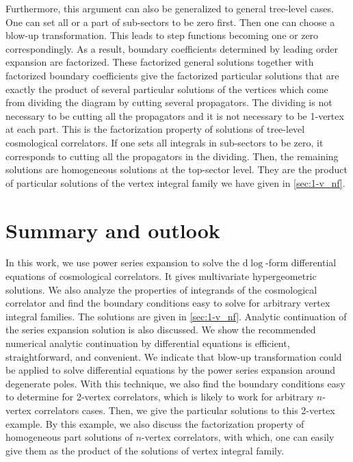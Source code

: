 \documentclass[a4paper,11pt]{article}
\newcommand{\nd}{\mathrm{d}}
\begin{document}
Furthermore, this argument can also be generalized to general tree-level cases. One can set all or a part of sub-sectors to be zero first. Then one can choose a blow-up transformation. This leads to step functions becoming one or zero correspondingly. As a result, boundary coefficients determined by leading order expansion are factorized. These factorized general solutions together with factorized boundary coefficients give the factorized particular solutions that are exactly the product of several particular solutions of the vertices which come from dividing the diagram by cutting several propagators. The dividing is not necessary to be cutting all the propagators and it is not necessary to be  1-vertex at each part.  This is the factorization property of solutions of tree-level cosmological correlators. If one sets all integrals in sub-sectors to be zero, it corresponds to cutting all the propagators in the dividing. Then, the remaining solutions are homogeneous solutions at the top-sector level. They are the product of particular solutions of the vertex integral family we have given in \ref{sec:1-v_nf}.







\section{Summary and outlook}\label{sec:summary}

In this work, we use power series expansion to solve the $\nd \log$-form differential equations of cosmological correlators. It gives multivariate hypergeometric solutions. We also analyze the properties of integrands of the cosmological correlator and find the boundary conditions easy to solve for arbitrary vertex integral families. The solutions are given in \ref{sec:1-v_nf}. Analytic continuation of the series expansion solution is also discussed. We show the recommended numerical analytic continuation by differential equations is efficient, straightforward, and convenient.  We indicate that blow-up transformation could be applied to solve differential equations by the power series expansion around degenerate poles. With this technique, we also find the boundary conditions easy to determine for 2-vertex correlators, which is likely to work for arbitrary $n$-vertex correlators cases. Then, we give the particular solutions to this 2-vertex example. By this example, we also discuss the factorization property of homogeneous part solutions of $n$-vertex correlators, with which, one can easily give them as the product of the solutions of vertex integral family.
\end{document}
